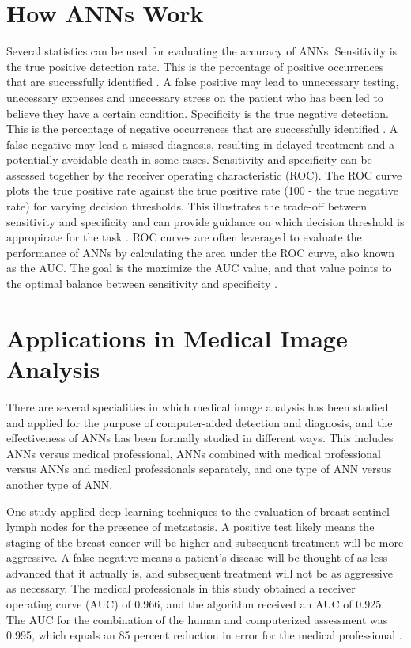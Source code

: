 \documentclass[sigconf]{acmart}
\begin{document}
\section{How ANNs Work}
Several statistics can be used for evaluating the accuracy of ANNs. Sensitivity is the true positive detection rate. This is the percentage of positive occurrences that are successfully identified \cite{cite11}. A false positive may lead to unnecessary testing, unecessary expenses and unecessary stress on the patient who has been led to believe they have a certain condition. Specificity is the true negative detection. This is the percentage of negative occurrences that are successfully identified \cite{cite11}. A false negative may lead a missed diagnosis, resulting in delayed treatment and a potentially avoidable death in some cases. Sensitivity and specificity can be assessed together by the receiver operating characteristic (ROC). The ROC curve plots the true positive rate against the true positive rate (100 - the true negative rate) for varying decision thresholds. This illustrates the trade-off between sensitivity and specificity and can provide guidance on which decision threshold is appropirate for the task \cite{cite11}. ROC curves are often leveraged to evaluate the performance of ANNs by calculating the area under the ROC curve, also known as the AUC. The goal is the maximize the AUC value, and that value points to the optimal balance between sensitivity and specificity \cite{cite11}.

\section{Applications in Medical Image Analysis}
There are several specialities in which medical image analysis has been studied and applied for the purpose of computer-aided detection and diagnosis, and the effectiveness of ANNs has been formally studied in different ways. This includes ANNs versus medical professional, ANNs combined with medical professional versus ANNs and medical professionals separately, and one type of ANN versus another type of ANN.

One study applied deep learning techniques to the evaluation of breast sentinel lymph nodes for the presence of metastasis. A positive test likely means the staging of the breast cancer will be higher and subsequent treatment will be more aggressive. A false negative means a patient's disease will be thought of as less advanced that it actually is, and subsequent treatment will not be as aggressive as necessary. The medical professionals in this study obtained a receiver operating curve (AUC) of 0.966, and the algorithm received an AUC of 0.925. The AUC for the combination of the human and computerized assessment was 0.995, which equals an 85 percent reduction in error for the medical professional \cite{cite09}.
\end{document}
